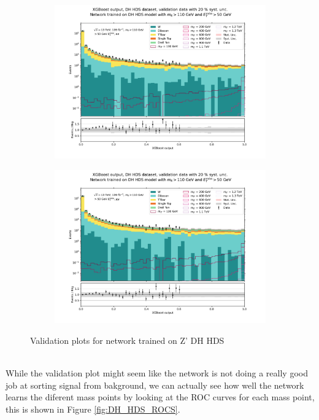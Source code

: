 \documentclass[12pt, a4paper]{book}
\begin{document}
\begin{figure}[!ht]
	\centering
	\begin{subfigure}[b]{0.49\textwidth}
      \centering
      \includegraphics[width=1\textwidth]{XGBoost/DH_HDS/VAL_ee.pdf}
      \end{subfigure}
   \hfill
   \begin{subfigure}[b]{0.49\textwidth}
      \centering
      \includegraphics[width=1\textwidth]{XGBoost/DH_HDS/VAL_uu.pdf}
      \end{subfigure}
   \caption{Validation plots for network trained on Z' DH HDS}\label{fig:DH_HDS_vals}
\end{figure}
\\While the validation plot might seem like the network is not doing a really good job at sorting signal from bakground, we can actually see how well the network learns the diferent mass points by looking at the ROC curves for each mass point, this is shown in Figure \ref{fig:DH_HDS_ROCS}. 
\end{document}
